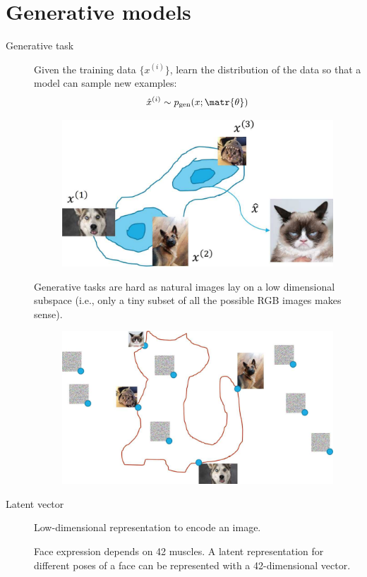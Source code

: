 \chapter{Generative models}


\begin{description}
    \item[Generative task] 
        Given the training data $\{ x^{(i)} \}$, learn the distribution of the data so that a model can sample new examples:
        \[ \hat{x}^{(i)} \sim p_\text{gen}(x; \matr{\theta}) \]

        \begin{figure}[H]
            \centering
            \includegraphics[width=0.4\linewidth]{./img/generative_task.jpg}
        \end{figure}

        \begin{remark}
            Generative tasks are hard as natural images lay on a low dimensional subspace (i.e., only a tiny subset of all the possible RGB images makes sense).

            \begin{figure}[H]
                \centering
                \includegraphics[width=0.6\linewidth]{./img/image_manifold.jpg}
            \end{figure}
        \end{remark}

    \item[Latent vector] 
        Low-dimensional representation to encode an image.

        \begin{example}
            Face expression depends on 42 muscles. A latent representation for different poses of a face can be represented with a 42-dimensional vector.
        \end{example}


\end{description}
